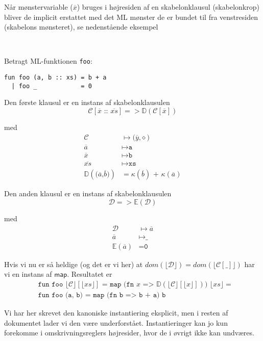 Når mønstervariable ($\overline{x}$) bruges i højresiden af en skabelonklausul
(skabelonkrop) bliver de implicit erstattet med det ML mønster de er bundet
til fra venstresiden (skabelons mønsteret), se nedenstående eksempel

\begin{example} \

  
  Betragt ML-funktionen \texttt{foo}:

\begin{verbatim}
fun foo (a, b :: xs) = b + a
  | foo _            = 0
\end{verbatim}

  Den første klausul er en instans af skabelonklausulen
  \[
  \mathcal{C}[\overline{x}\texttt{ :: }\overline{xs}] =>
  \mathbb{D}(\mathcal{C}[\overline{x}])
  \]

  med
  \begin{align}
    \mathcal{C} &\mapsto \texttt{(}\overline{y}\texttt{,} \diamond\texttt{)}\\
    \overline{a} &\mapsto \texttt{a}\\
    \overline{x} &\mapsto \texttt{b}\\
    \overline{xs} &\mapsto \texttt{xs}\\
    \mathbb{D}(\texttt{(}\overline{a}\texttt{,} \overline{b}\texttt{)}) &=
    \kappa(\overline{b}) \texttt{ + } \kappa(\overline{a})
  \end{align}

  Den anden klausul er en instans af skabelonklausulen
  \[
  \mathcal{D} => \mathbb{E}(\mathcal{D})
  \]

  med
  \begin{align}
    \mathcal{D} &\mapsto \overline{a}\\
    \overline{a} &\mapsto \texttt{\_}\\
    \mathbb{E}(\overline{a}) &= \texttt{0}
  \end{align}

  Hvis vi nu er så heldige (og det er vi her) at $dom(\lfloor\mathcal{D}\rfloor)
  = dom(\lfloor\mathcal{C[\texttt{\_}]}\rfloor)$ har vi en instans af
  $\textsf{map}$. Resultatet er
  \begin{align}
    &\texttt{fun foo $\lfloor \mathcal{C} \rfloor [\lfloor xs \rfloor]$ = map (fn $x$ =>
      $\mathbb{D}(\lfloor \mathcal{C} \rfloor[\lfloor x \rfloor])$) $\lfloor xs
      \rfloor$} =\\
    &\texttt{fun foo (a, b) = map (fn b => b + a) b}
  \end{align}

  Vi har her skrevet den kanoniske instantiering eksplicit, men i resten af
  dokumentet lader vi den være underforstået. Instantieringer kan jo kun
  forekomme i omskrivningsreglers højresider, hvor de i øvrigt ikke kan
  undværes.
\end{example}


